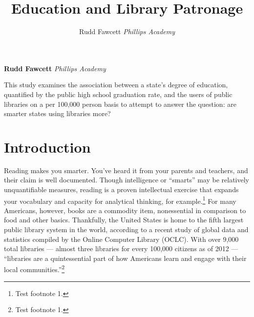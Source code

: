 \documentclass[12pt,]{article}
\title{Education and Library Patronage  }
\author{\Large Rudd Fawcett\vspace{0.05in} \newline\normalsize\emph{Phillips Academy}  }
\date{}
\newcommand*{\authorfont}{\fontfamily{phv}\selectfont}
\renewenvironment{abstract}
 {{%
    \setlength{\leftmargin}{0mm}
    \setlength{\rightmargin}{\leftmargin}%
  }%
  \relax}
 {\endlist}
\begin{document}
	
%

{%
\setlength{\parindent}{0pt}
\thispagestyle{plain}
{\fontsize{18}{20}\selectfont\raggedright 
\maketitle  %

}

{
   \vskip 13.5pt\relax \normalsize\fontsize{11}{12} 
\textbf{\authorfont Rudd Fawcett} \hskip 15pt \emph{\small Phillips Academy}   

}

}








\begin{abstract}

    \hbox{\vrule height .2pt width 39.14pc}

    \vskip 8.5pt %

\noindent This study examines the association between a state's degree of
education, quantified by the public high school graduation rate, and the
users of public libraries on a per 100,000 person basis to attempt to
answer the question: are smarter states using libraries more?


    \hbox{\vrule height .2pt width 39.14pc}


\end{abstract}


\vskip 6.5pt


\noindent \doublespacing \newpage

\section{Introduction}\label{introduction}

Reading makes you smarter. You've heard it from your parents and
teachers, and their claim is well documented. Though intelligence or
``smarts'' may be relatively unquantifiable measures, reading is a
proven intellectual exercise that expands your vocabulary and capacity
for analytical thinking, for example.\footnote{Test footnote 1.} For
many Americans, however, books are a commodity item, nonessential in
comparison to food and other basics. Thankfully, the United States is
home to the fifth largest public library system in the world, according
to a recent study of global data and statistics compiled by the Online
Computer Library (OCLC). With over 9,000 total libraries --- almost
three libraries for every 100,000 citizens as of 2012 --- ``libraries
are a quintessential part of how Americans learn and engage with their
local communities.''\footnote{Test footnote 1.}
\end{document}
